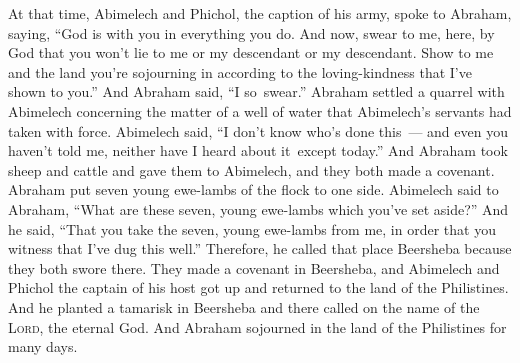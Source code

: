 \begin{inparaenum}
   At that time, Abimelech and Phichol, the caption of his army, spoke to Abraham, saying, ``God is with you in everything you do.%
   And now, swear to me, here, by God that you won't lie to me or my descendant or my descendant. Show to me and the land you're sojourning in according to the loving-kindness that I've shown to you.''%
   And Abraham said, ``I so\understood\ swear.''%
   Abraham settled a quarrel with Abimelech concerning the matter of a well of water that Abimelech's servants had taken with force.%
   Abimelech said, ``I don't know who's done this~--- and even you haven't told me, neither have I heard {about it}\understood\ except today.''%
   And Abraham took sheep and cattle and gave them to Abimelech, and they both made a covenant.%
   Abraham put seven young ewe-lambs of the flock to one side.%
   Abimelech said to Abraham, ``What are these seven, young ewe-lambs which you've set aside?''%
   And he said, ``That you take the seven, young ewe-lambs from me, in order that you witness that I've dug this well.''%
   Therefore, he called that place Beersheba because they both swore there.%
   They made a covenant in Beersheba, and Abimelech and Phichol the captain of his host got up and returned to the land of the Philistines.%
   And he planted a tamarisk in Beersheba and there called on the name of the \textsc{Lord}, the eternal God.%
   And Abraham sojourned in the land of the Philistines for many days.%
\end{inparaenum}
